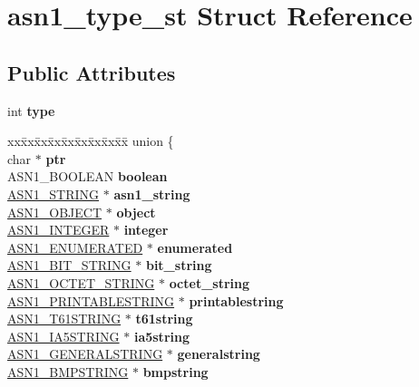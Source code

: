 \hypertarget{structasn1__type__st}{}\section{asn1\+\_\+type\+\_\+st Struct Reference}
\label{structasn1__type__st}
\subsection*{Public Attributes}
\begin{DoxyCompactItemize}
\item 
\mbox{\label{structasn1__type__st_af1bd6ef16c406f3cd3fa67eb81693b54}} 
int {\bfseries type}
\item 
\mbox{\label{structasn1__type__st_afb112a04d750a5e962a6b96456488820}} 
\begin{tabbing}
xx\=xx\=xx\=xx\=xx\=xx\=xx\=xx\=xx\=\kill
union \{\\
\>char $\ast$ {\bfseries ptr}\\
\>ASN1\_BOOLEAN {\bfseries boolean}\\
\>\hyperlink{structasn1__string__st}{ASN1\_STRING} $\ast$ {\bfseries asn1\_string}\\
\>\hyperlink{structasn1__object__st}{ASN1\_OBJECT} $\ast$ {\bfseries object}\\
\>\hyperlink{structasn1__string__st}{ASN1\_INTEGER} $\ast$ {\bfseries integer}\\
\>\hyperlink{structasn1__string__st}{ASN1\_ENUMERATED} $\ast$ {\bfseries enumerated}\\
\>\hyperlink{structasn1__string__st}{ASN1\_BIT\_STRING} $\ast$ {\bfseries bit\_string}\\
\>\hyperlink{structasn1__string__st}{ASN1\_OCTET\_STRING} $\ast$ {\bfseries octet\_string}\\
\>\hyperlink{structasn1__string__st}{ASN1\_PRINTABLESTRING} $\ast$ {\bfseries printablestring}\\
\>\hyperlink{structasn1__string__st}{ASN1\_T61STRING} $\ast$ {\bfseries t61string}\\
\>\hyperlink{structasn1__string__st}{ASN1\_IA5STRING} $\ast$ {\bfseries ia5string}\\
\>\hyperlink{structasn1__string__st}{ASN1\_GENERALSTRING} $\ast$ {\bfseries generalstring}\\
\>\hyperlink{structasn1__string__st}{ASN1\_BMPSTRING} $\ast$ {\bfseries bmpstring}\\

\end{tabbing}
\end{DoxyCompactItemize}
